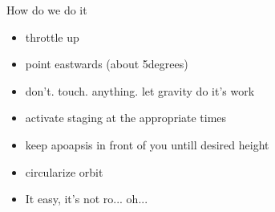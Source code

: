 {\begin{frame}
    \begin{block}{How do we do it}
        \begin{itemize}
            \item throttle up
            \item point eastwards (about 5degrees)
            \item don't. touch. anything. let gravity do it's work
            \item activate staging at the appropriate times
            \item keep apoapsis in front of you untill desired height
            \item circularize orbit
            \item It easy, it's not ro... oh...
        \end{itemize}
    \end{block}
\end{frame}
}
